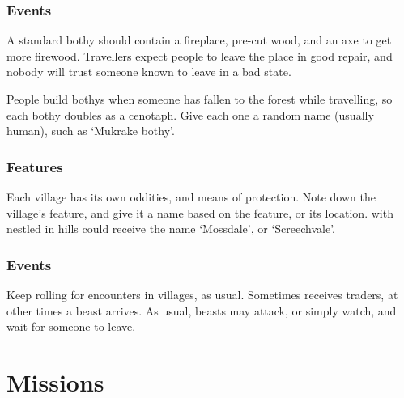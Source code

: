 \begin{multicols}{2}

\subsubsection{ Events}
A standard \gls{bothy} should contain a fireplace, pre-cut wood, and an axe to get more firewood.
Travellers expect people to leave the place in good repair, and nobody will trust someone known to leave  in a bad state.

People build \glspl{bothy} when someone has fallen to the forest while travelling, so each \gls{bothy} doubles as a cenotaph.
Give each one a random name (usually human), such as `Mukrake \Gls{bothy}'.

\bothyEvents

\subsubsection{ Features}
\label{villageFeatures}

Each \gls{village} has its own oddities, and means of protection.
Note down the \gls{village}'s feature, and give it a name based on the feature, or its location.
 with  nestled in hills could receive the name `Mossdale', or `Screechvale'.

\encVillageFeatures

\subsubsection{ Events}

Keep rolling for encounters in \glspl{village}, as usual.
Sometimes  receives traders, at other times a beast arrives.
As usual, beasts may attack, or simply watch, and wait for someone to leave.

\encVillageEvent

\end{multicols}

\section{Missions}
\label{NGmissions}

